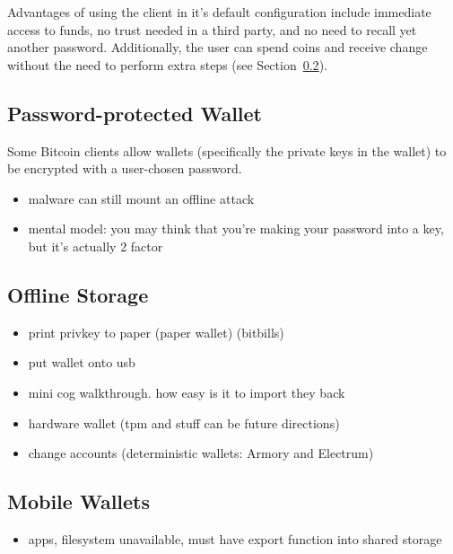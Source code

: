 Advantages of using the \bitcoinclient client in it's default configuration include immediate access to funds, no trust needed in a third party, and no need to recall yet another password. Additionally, the user can spend coins and receive change without the need to perform extra steps (see Section~\ref{sec:offline storage}). 


\subsection{Password-protected Wallet}
Some Bitcoin clients allow wallets (specifically the private keys in the wallet) to be encrypted with a user-chosen password.
\begin{itemize}
  \item malware can still mount an offline attack
  \item mental model: you may think that you're making your password into a key, but it's actually 2 factor
\end{itemize}


\subsection{Offline Storage}
\label{sec:offline storage}
\begin{itemize}
  \item print privkey to paper (paper wallet) (bitbills)
  \item put wallet onto usb
  \item mini cog walkthrough. how easy is it to import they back
  \item hardware wallet (tpm and stuff can be future directions)
  \item change accounts (\cf deterministic wallets: Armory and Electrum)
\end{itemize}
\subsection{Mobile Wallets}
\begin{itemize}
  \item apps, filesystem unavailable, must have export function into shared storage
\end{itemize}
